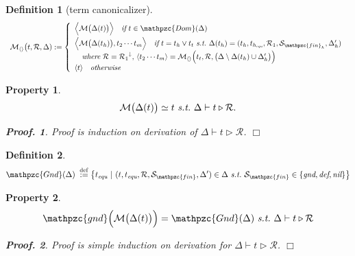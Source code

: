 \documentclass[12pt]{article}
\newtheorem{Definition}{Definition}[section]
\newtheorem{Property}{Property}[section]
\newtheorem{Proof}{Proof.}
\begin{document}
\begin{Definition}[term canonicalizer]
\begin{displaymath}
\begin{array}{l}
     \mathcal{M}_{\langle\rangle}\bigl(t, \mathcal{R},\Delta) :=
     \left\{\begin{array}{l}
       \Bigl\langle\mathcal{M}\bigl(\Delta(t) \bigr) \Bigr\rangle
        \quad \text{\it if}\ t \in \mathpzc{Dom}(\Delta)  \\ [5pt]
       \Bigl\langle\mathcal{M}\bigl(\Delta(t_h) \bigr), t_2 \cdots t_m
        \Bigr\rangle \quad \text{\it if}\ t = t_h \vee t_t\ \text{\it s.t.}\
         \Delta(t_h) = (t_h, t_{h_{\text{\it equ}}}, \mathcal{R}_1,
          \mathcal{S}_{\mathpzc{fin}_h}, \Delta'_h)  \\
       \quad \text{\it where}\ \mathcal{R} = {\mathcal{R}_1}^\downarrow,\,
        \langle t_2 \cdots t_m\rangle =
         \mathcal{M}_{\langle\rangle}\Bigl(t_t, \mathcal{R}, \bigl(
          \Delta \setminus \Delta(t_h) \cup \Delta'_h \bigr) \Bigr)  \\
       \langle t \rangle \quad \text{\it otherwise}
     \end{array}\right.
    \end{array}
  \end{displaymath}
\end{Definition}


\begin{Property}
  \label{equality_over_transduction}
  \[ \mathcal{M}\bigl(\Delta(t) \bigr) \simeq t\ \text{\it s.t.}\
      \Delta \vdash t \triangleright \mathcal{R}.
  \]
  \begin{Proof}
    Proof is induction on derivation of
    $\Delta \vdash t \triangleright \mathcal{R}$.
    $\Box$
  \end{Proof}
\end{Property}


\begin{Definition}
  \[ \mathpzc{Gnd}(\Delta) \;\stackrel{\mathrm{def}}{:=}
      \bigl\{t_{\text{\it equ}}\ |\ (t, t_{\text{\it equ}}, \mathcal{R},
       \mathcal{S}_{\mathpzc{fin}}, \Delta') \in \Delta\ \text{\it s.t.}\
        \mathcal{S}_{\mathpzc{fin}} \in \{\text{\it gnd}, \text{\it def},
         \text{\it nil} \} \bigr\}
  \]
\end{Definition}


\begin{Property}
  \label{consistency_on_grand_terms}
  \[ \mathpzc{gnd}\Bigl(\mathcal{M}\bigl(\Delta(t) \bigr) \Bigr) =
      \mathpzc{Gnd}(\Delta)\ \text{\it s.t.}\
       \Delta \vdash t \triangleright \mathcal{R}
  \]
  \begin{Proof}
    Proof is simple induction on derivation for
    $\Delta \vdash t \triangleright \mathcal{R}$.
    $\Box$
  \end{Proof}
\end{Property}
\end{document}
